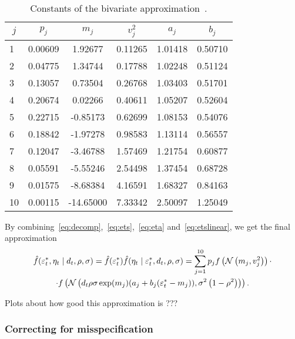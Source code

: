 \begin{table}[h!]
	\centering
	\caption{Constants of the bivariate approximation~\citep{Omori2007}.}
	\label{tab:constants}
	\begin{tabular}{cccccc}
		$j$                       & $p_j$    & $m_j$      & $v_j^2$ & $a_j$    & $b_j$    \\ \hline
		\multicolumn{1}{l|}{1}  & 0.00609 & 1.92677   & 0.11265                & 1.01418 & 0.50710 \\
		\multicolumn{1}{l|}{2}  & 0.04775 & 1.34744   & 0.17788                & 1.02248 & 0.51124 \\
		\multicolumn{1}{l|}{3}  & 0.13057 & 0.73504   & 0.26768                & 1.03403 & 0.51701 \\
		\multicolumn{1}{l|}{4}  & 0.20674 & 0.02266   & 0.40611                & 1.05207 & 0.52604 \\
		\multicolumn{1}{l|}{5}  & 0.22715 & -0.85173  & 0.62699                & 1.08153 & 0.54076 \\
		\multicolumn{1}{l|}{6}  & 0.18842 & -1.97278  & 0.98583                & 1.13114 & 0.56557 \\
		\multicolumn{1}{l|}{7}  & 0.12047 & -3.46788  & 1.57469                & 1.21754 & 0.60877 \\
		\multicolumn{1}{l|}{8}  & 0.05591 & -5.55246  & 2.54498                & 1.37454 & 0.68728 \\
		\multicolumn{1}{l|}{9}  & 0.01575 & -8.68384  & 4.16591                & 1.68327 & 0.84163 \\
		\multicolumn{1}{l|}{10} & 0.00115 & -14.65000 & 7.33342                & 2.50097 & 1.25049
	\end{tabular}
\end{table}

By combining~\eqref{eq:decomp},~\eqref{eq:ets},~\eqref{eq:eta} and~\eqref{eq:etslinear}, we get the final approximation
\begin{multline*}
\hat f(\varepsilon_t^\ast,\eta_t\mid d_t,\rho,\sigma) = \hat f(\varepsilon_t^\ast)\hat f(\eta_t\mid\varepsilon_t^\ast,d_t,\rho,\sigma) = \sum_{j=1}^{10}p_jf\left(\mathcal{N}\left(m_j,v_j^2\right)\right)\cdot \\
\cdot f\left(\mathcal{N}\left(d_t\rho\sigma\exp(m_j)(a_j+b_j(\varepsilon_t^\ast-m_j)),\sigma^2\left(1-\rho^2\right)\right)\right).
\end{multline*}

Plots about how good this approximation is ???

\subsubsection{Correcting for misspecification}

